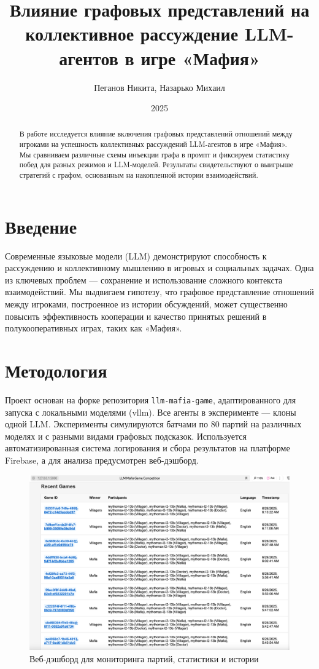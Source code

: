 \documentclass[a4paper,12pt]{article}
\title{Влияние графовых представлений на коллективное рассуждение LLM-агентов в игре «Мафия»}
\author{Пеганов Никита, Назарько Михаил}
\date{2025}
\begin{document}
\maketitle

\begin{abstract}
В работе исследуется влияние включения графовых представлений отношений между игроками на успешность коллективных рассуждений LLM-агентов в игре «Мафия». Мы сравниваем различные схемы инъекции графа в промпт и фиксируем статистику побед для разных режимов и LLM-моделей. Результаты свидетельствуют о выигрыше стратегий с графом, основанным на накопленной истории взаимодействий.
\end{abstract}

\section{Введение}
Современные языковые модели (LLM) демонстрируют способность к рассуждению и коллективному мышлению в игровых и социальных задачах. Одна из ключевых проблем — сохранение и использование сложного контекста взаимодействий. Мы выдвигаем гипотезу, что графовое представление отношений между игроками, построенное из истории обсуждений, может существенно повысить эффективность кооперации и качество принятых решений в полукооперативных играх, таких как «Мафия».

\section{Методология}
Проект основан на форке репозитория \texttt{llm-mafia-game}, адаптированного для запуска с локальными моделями (vllm). Все агенты в эксперименте — клоны одной LLM. Эксперименты симулируются батчами по 80 партий на различных моделях и с разными видами графовых подсказок. Используется автоматизированная система логирования и сбора результатов на платформе Firebase, а для анализа предусмотрен веб-дэшборд.

\begin{figure}[h!]
    \centering
    \includegraphics[width=0.85\linewidth]{dashboard.png}
    \caption{Веб-дэшборд для мониторинга партий, статистики и истории}
    \label{fig:dashboard}
\end{figure}
\end{document}
